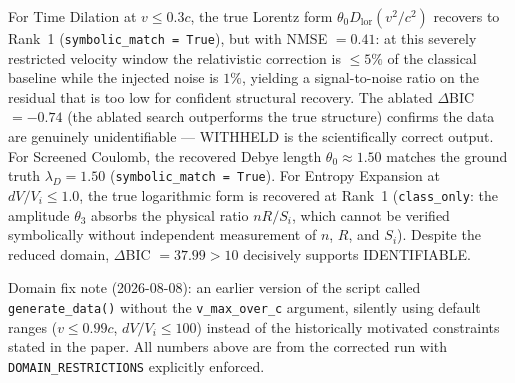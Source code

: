 ﻿\documentclass{article}
\begin{document}
\begin{table}[ht]
  \small
  \caption{Rediscovery of canonical corrections under historical low-signal regimes. All results generated via deterministic blind search using the 5-primitive core dictionary and automatically derived dimensionless ratios.}
  \label{tab:results}
  \centering
\end{table}

For Time Dilation at $v \le 0.3c$, the true Lorentz form $\theta_0 D_{\mathrm{lor}}(v^2/c^2)$ recovers to Rank~1 (\texttt{symbolic\_match = True}), but with NMSE $= 0.41$: at this severely restricted velocity window the relativistic correction is $\le 5\%$ of the classical baseline while the injected noise is $1\%$, yielding a signal-to-noise ratio on the residual that is too low for confident structural recovery. The ablated $\Delta$BIC $= -0.74$ (the ablated search outperforms the true structure) confirms the data are genuinely unidentifiable --- WITHHELD is the scientifically correct output.
For Screened Coulomb, the recovered Debye length $\theta_0 \approx 1.50$ matches
the ground truth $\lambda_D = 1.50$ (\texttt{symbolic\_match = True}).
For Entropy Expansion at $dV/V_i \le 1.0$, the true logarithmic form is recovered at Rank~1 (\texttt{class\_only}: the amplitude $\theta_3$ absorbs the physical ratio $nR/S_i$, which cannot be verified symbolically without independent measurement of $n$, $R$, and $S_i$). Despite the reduced domain, $\Delta$BIC $= 37.99 > 10$ decisively supports IDENTIFIABLE.

Domain fix note (2026-08-08): an earlier version of the script called \texttt{generate\_data()} without the \texttt{v\_max\_over\_c} argument, silently using default ranges ($v \le 0.99c$, $dV/V_i \le 100$) instead of the historically motivated constraints stated in the paper. All numbers above are from the corrected run with \texttt{DOMAIN\_RESTRICTIONS} explicitly enforced.
\end{document}
